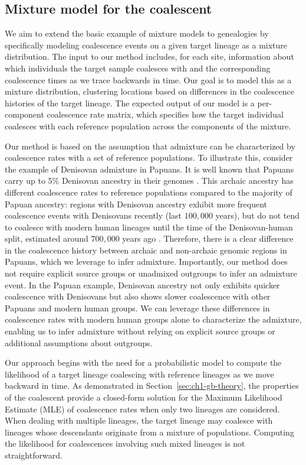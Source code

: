 \subsection{Mixture model for the coalescent}
\label{the_model}
We aim to extend the basic example of mixture models to genealogies by specifically modeling coalescence events on a given target lineage as a mixture distribution. The input to our method includes, for each site, information about which individuals the target sample coalesces with and the corresponding coalescence times as we trace backwards in time. Our goal is to model this as a mixture distribution, clustering locations based on differences in the coalescence histories of the target lineage. The expected output of our model is a per-component coalescence rate matrix, which specifies how the target individual coalesces with each reference population across the components of the mixture.

Our method is based on the assumption that admixture can be characterized by coalescence rates with a set of reference populations. To illustrate this, consider the example of Denisovan admixture in Papuans. It is well known that Papuans carry up to 5\% Denisovan ancestry in their genomes \cite{reich2010genetic}. This archaic ancestry has different coalescence rates to reference populations compared to the majority of Papuan ancestry: regions with Denisovan ancestry exhibit more frequent coalescence events with Denisovans recently (last $100{,}000$ years), but do not tend to coalesce with modern human lineages until the time of the Denisovan-human split, estimated around $700{,}000$ years ago \cite{reich2010genetic}. Therefore, there is a clear difference in the coalescence history between archaic and non-archaic genomic regions in Papuans, which we leverage to infer admixture. Importantly, our method does not require explicit source groups or unadmixed outgroups to infer an admixture event. In the Papuan example, Denisovan ancestry not only exhibits quicker coalescence with Denisovans but also shows slower coalescence with other Papuans and modern human groups. We can leverage these differences in coalescence rates with modern human groups alone to characterize the admixture, enabling us to infer admixture without relying on explicit source groups or additional assumptions about outgroups.

Our approach begins with the need for a probabilistic model to compute the likelihood of a target lineage coalescing with reference lineages as we move backward in time. As demonstrated in Section~\ref{sec:ch1-gb-theory}, the properties of the coalescent provide a closed-form solution for the Maximum Likelihood Estimate (MLE) of coalescence rates when only two lineages are considered. When dealing with multiple lineages, the target lineage may coalesce with lineages whose descendants originate from a mixture of populations. Computing the likelihood for coalescences involving such mixed lineages is not straightforward. 

